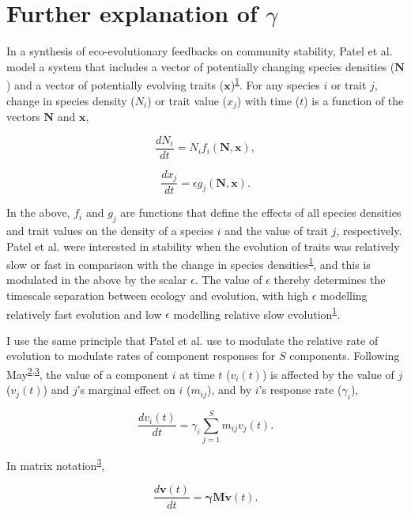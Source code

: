 \documentclass[]{article}
\begin{document}
\hypertarget{moregamma}{\section{\texorpdfstring{Further explanation of
\(\gamma\)}{Further explanation of \textbackslash{}gamma}}\label{moregamma}}

In a synthesis of eco-evolutionary feedbacks on community stability,
Patel et al. model a system that includes a vector of potentially
changing species densities (\(\mathbf{N}\)) and a vector of potentially
evolving traits
(\(\mathbf{x}\))\textsuperscript{\protect\hyperlink{ref-Patel2018}{1}}.
For any species \(i\) or trait \(j\), change in species density
(\(N_{i}\)) or trait value (\(x_{j}\)) with time (\(t\)) is a function
of the vectors \(\mathbf{N}\) and \(\mathbf{x}\),

\[\frac{dN_{i}}{dt} = N_{i}f_{i}(\mathbf{N}, \mathbf{x}),\]

\[\frac{dx_{j}}{dt} = \epsilon g_{j}(\mathbf{N}, \mathbf{x}).\]

In the above, \(f_{i}\) and \(g_{j}\) are functions that define the
effects of all species densities and trait values on the density of a
species \(i\) and the value of trait \(j\), respectively. Patel et al.
were interested in stability when the evolution of traits was relatively
slow or fast in comparison with the change in species
densities\textsuperscript{\protect\hyperlink{ref-Patel2018}{1}}, and
this is modulated in the above by the scalar \(\epsilon\). The value of
\(\epsilon\) thereby determines the timescale separation between ecology
and evolution, with high \(\epsilon\) modelling relatively fast
evolution and low \(\epsilon\) modelling relative slow
evolution\textsuperscript{\protect\hyperlink{ref-Patel2018}{1}}.

I use the same principle that Patel et al. use to modulate the relative
rate of evolution to modulate rates of component responses for \(S\)
components. Following
May\textsuperscript{\protect\hyperlink{ref-May1972}{2},\protect\hyperlink{ref-May1973}{3}},
the value of a component \(i\) at time \(t\) (\(v_{i}(t)\)) is affected
by the value of \(j\) (\(v_{j}(t)\)) and \(j\)'s marginal effect on
\(i\) (\(m_{ij}\)), and by \(i\)'s response rate (\(\gamma_{i}\)),

\[\frac{dv_{i}(t)}{dt} = \gamma_{i} \sum_{j=1}^{S}m_{ij}v_{j}(t).\]

In matrix notation\textsuperscript{\protect\hyperlink{ref-May1973}{3}},

\[\frac{d\mathbf{v}(t)}{dt} = \mathbf{\gamma} \mathbf{M}\mathbf{v}(t).\]
\end{document}
